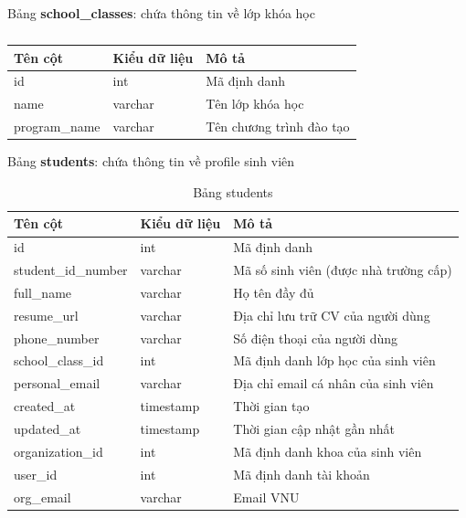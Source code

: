 \documentclass[./../main.tex]{subfiles}
\begin{document}
Bảng \textbf{school\_classes}: chứa thông tin về lớp khóa học

\begin{table}[H]
	\caption{}
	\label{tab:db_school_classes}
	\begin{tabular}{|l|l|l|}
	\hline
	\textbf{Tên cột} & \textbf{Kiểu dữ liệu} & \textbf{Mô tả}           \\ \hline
	id               & int                   & Mã định danh             \\ \hline
	name             & varchar               & Tên lớp khóa học         \\ \hline
	program\_name    & varchar               & Tên chương trình đào tạo \\ \hline
	\end{tabular}
\end{table}

Bảng \textbf{students}: chứa thông tin về profile sinh viên

\begin{table}[H]
	\caption{Bảng students}
	\label{tab:db_students}
	\begin{tabularx}{\textwidth}{|l|l|X|}
	\hline
	\textbf{Tên cột}    & \textbf{Kiểu dữ liệu} & \textbf{Mô tả}                        \\ \hline
	id                  & int                   & Mã định danh                          \\ \hline
	student\_id\_number & varchar               & Mã số sinh viên (được nhà trường cấp) \\ \hline
	full\_name          & varchar               & Họ tên đầy đủ                         \\ \hline
	resume\_url         & varchar               & Địa chỉ lưu trữ CV của người dùng     \\ \hline
	phone\_number       & varchar               & Số điện thoại của người dùng          \\ \hline
	school\_class\_id   & int                   & Mã định danh lớp học của sinh viên    \\ \hline
	personal\_email     & varchar               & Địa chỉ email cá nhân của sinh viên   \\ \hline
	created\_at         & timestamp             & Thời gian tạo                         \\ \hline
	updated\_at         & timestamp             & Thời gian cập nhật gần nhất           \\ \hline
	organization\_id    & int                   & Mã định danh khoa của sinh viên       \\ \hline
	user\_id            & int                   & Mã định danh tài khoản                \\ \hline
	org\_email          & varchar               & Email VNU                             \\ \hline
	\end{tabularx}%
\end{table}
\end{document}
